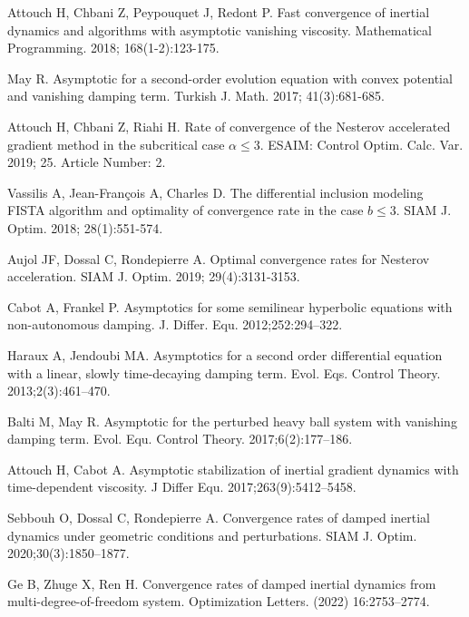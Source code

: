 \documentclass[review]{elsarticle}
\begin{document}
\begin{thebibliography}{}
 	Attouch H,  Chbani Z,  Peypouquet J, Redont P.  Fast convergence of inertial dynamics and algorithms with asymptotic vanishing viscosity. Mathematical Programming. 2018; {168}(1-2):123-175.
 	
 	May R. Asymptotic for a second-order evolution equation with convex potential and vanishing damping term. Turkish J. Math. 2017; {41}(3):681-685.
	
 	Attouch H, Chbani Z, Riahi H. Rate of convergence of the Nesterov accelerated gradient method in the subcritical case $\alpha\leq 3$. ESAIM: Control Optim. Calc. Var.  2019; {25}. Article Number: 2.

 	 Vassilis A, Jean-Fran{\c{c}}ois A, Charles D. The differential inclusion modeling FISTA algorithm and optimality of convergence rate in the case $b \leq3$. SIAM J. Optim. 2018; {28}(1):551-574.

 		
	 Aujol JF, Dossal C, Rondepierre A.  Optimal convergence rates for Nesterov acceleration. SIAM J. Optim. 2019; {29}(4):3131-3153.
 	


Cabot A, Frankel P. Asymptotics for some semilinear hyperbolic equations with non-autonomous damping. J. Differ. Equ. 2012;252:294–322.

Haraux A, Jendoubi MA. Asymptotics for a second order differential equation with a linear, slowly time-decaying damping term. Evol. Eqs. Control Theory. 2013;2(3):461–470.

Balti M, May R. Asymptotic for the perturbed heavy ball system with vanishing damping term. Evol. Equ. Control Theory. 2017;6(2):177–186.

Attouch H, Cabot A. Asymptotic stabilization of inertial gradient dynamics with time-dependent viscosity. J Differ Equ. 2017;263(9):5412–5458.

Sebbouh O, Dossal C, Rondepierre A. Convergence rates of damped inertial dynamics under geometric conditions and perturbations. SIAM J. Optim. 2020;30(3):1850–1877.

Ge B, Zhuge X, Ren H. Convergence rates of damped inertial dynamics from
multi-degree-of-freedom system. Optimization Letters. (2022) 16:2753–2774. 



		
		

\end{thebibliography}
\end{document}
